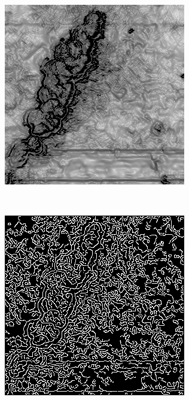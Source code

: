 \documentclass[../main.tex]{subfiles}
\begin{document}
\begin{figure}[!ht]
\begin{subfigure}{0.3\linewidth}
	\end{subfigure}
	\hfill
	\begin{subfigure}{0.3\linewidth}
		\centering
		\includegraphics[keepaspectratio, width=\linewidth]{images/bm3d_grad.png}
	\end{subfigure}\\[20pt]
	\begin{subfigure}{0.3\linewidth}
		\centering
		\includegraphics[keepaspectratio, width=\linewidth]{images/orig_edge.png}

\end{subfigure}
\end{figure}
\end{document}
